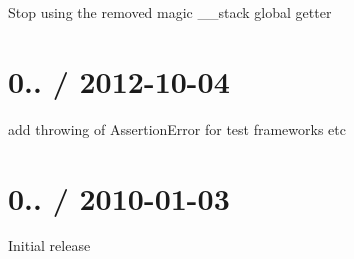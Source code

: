 
\begin{DoxyItemize}
\item Stop using the removed magic \+\_\+\+\_\+stack global getter
\end{DoxyItemize}

\section*{0.. / 2012-\/10-\/04 }


\begin{DoxyItemize}
\item add throwing of Assertion\+Error for test frameworks etc
\end{DoxyItemize}

\section*{0.. / 2010-\/01-\/03 }


\begin{DoxyItemize}
\item Initial release 
\end{DoxyItemize}